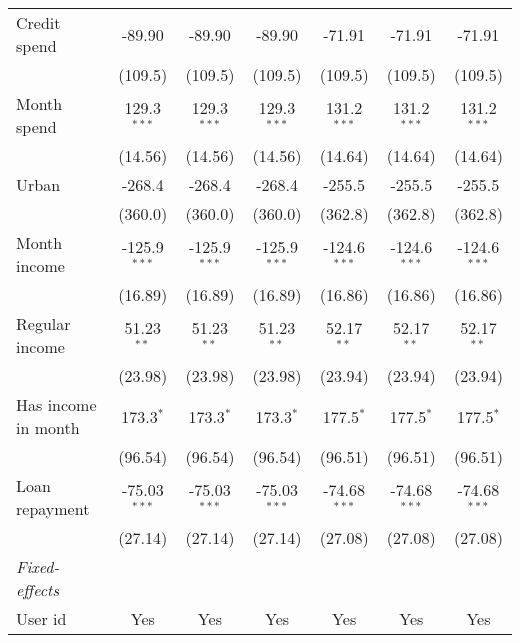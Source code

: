 \begin{table}[htbp]
\begin{threeparttable}[b]
\begin{tabular}{lcccccc}
         Credit spend        & -89.90         & -89.90         & -89.90         & -71.91         & -71.91         & -71.91\\   
                             & (109.5)        & (109.5)        & (109.5)        & (109.5)        & (109.5)        & (109.5)\\   
         Month spend         & 129.3$^{***}$  & 129.3$^{***}$  & 129.3$^{***}$  & 131.2$^{***}$  & 131.2$^{***}$  & 131.2$^{***}$\\   
                             & (14.56)        & (14.56)        & (14.56)        & (14.64)        & (14.64)        & (14.64)\\   
         Urban               & -268.4         & -268.4         & -268.4         & -255.5         & -255.5         & -255.5\\   
                             & (360.0)        & (360.0)        & (360.0)        & (362.8)        & (362.8)        & (362.8)\\   
         Month income        & -125.9$^{***}$ & -125.9$^{***}$ & -125.9$^{***}$ & -124.6$^{***}$ & -124.6$^{***}$ & -124.6$^{***}$\\   
                             & (16.89)        & (16.89)        & (16.89)        & (16.86)        & (16.86)        & (16.86)\\   
         Regular income      & 51.23$^{**}$   & 51.23$^{**}$   & 51.23$^{**}$   & 52.17$^{**}$   & 52.17$^{**}$   & 52.17$^{**}$\\   
                             & (23.98)        & (23.98)        & (23.98)        & (23.94)        & (23.94)        & (23.94)\\   
         Has income in month & 173.3$^{*}$    & 173.3$^{*}$    & 173.3$^{*}$    & 177.5$^{*}$    & 177.5$^{*}$    & 177.5$^{*}$\\   
                             & (96.54)        & (96.54)        & (96.54)        & (96.51)        & (96.51)        & (96.51)\\   
         Loan repayment      & -75.03$^{***}$ & -75.03$^{***}$ & -75.03$^{***}$ & -74.68$^{***}$ & -74.68$^{***}$ & -74.68$^{***}$\\   
                             & (27.14)        & (27.14)        & (27.14)        & (27.08)        & (27.08)        & (27.08)\\   
         \midrule
         \emph{Fixed-effects}\\
         User id             & Yes            & Yes            & Yes            & Yes            & Yes            & Yes\\  

\end{tabular}
\end{threeparttable}
\end{table}
